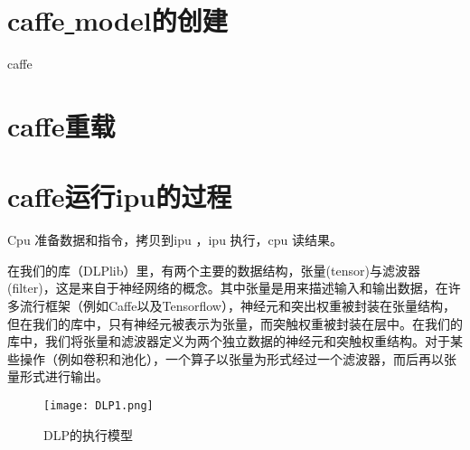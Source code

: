\section{caffe\underline{ }model的创建}
caffe
\section{caffe重载}

\section{caffe运行ipu的过程}
Cpu 准备数据和指令，拷贝到ipu ，ipu 执行，cpu 读结果。

在我们的库（DLPlib）里，有两个主要的数据结构，张量(tensor)与滤波器(filter)，这是来自于神经网络的概念。其中张量是用来描述输入和输出数据，在许多流行框架（例如Caffe以及Tensorflow），神经元和突出权重被封装在张量结构，但在我们的库中，只有神经元被表示为张量，而突触权重被封装在层中。在我们的库中，我们将张量和滤波器定义为两个独立数据的神经元和突触权重结构。对于某些操作（例如卷积和池化），一个算子以张量为形式经过一个滤波器，而后再以张量形式进行输出。
\begin{figure}[!htbp]
\centering
\texttt{[image: DLP1.png]}
\caption{DLP的执行模型}
\label{fig:Software stock}
\end{figure}